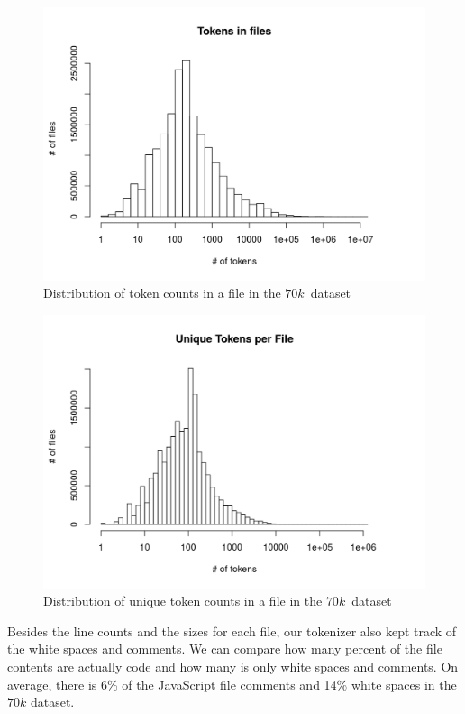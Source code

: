 \documentclass[thesis=M,english]{FITthesis}[2012/10/20]
\begin{document}
\begin{center}
\begin{figure}[h!]
	\includegraphics[totalheight=230pt]{images/70k_tokens.png}
	\caption{Distribution of token counts in a file in the $70k$ dataset}
	\label{fig: 70k_tokens}
\end{figure}
\begin{figure}[h!]
	\includegraphics[totalheight=230pt]{images/70k_uniquetokens.png}
	\caption{Distribution of unique token counts in a file in the $70k$ dataset}
	\label{fig: 70k_uniquetokens}
\end{figure}
\end{center}

Besides the line counts and the sizes for each file, our tokenizer also kept track of the white spaces and comments. We can compare how many percent of the file contents are actually code and how many is only white spaces and comments. On average, there is 6\% of the JavaScript file comments and 14\% white spaces in the $70k$ dataset. \\
\end{document}
